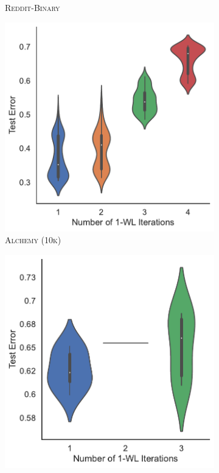 \begin{figure}[!htb]
\begin{subfigure}[b]{0.19\textwidth}
        \caption{\scriptsize \textsc{Reddit-Binary}}
	\end{subfigure}
	\hfill
	\begin{subfigure}[b]{0.19\textwidth}
		\centering
		\includegraphics[width=\textwidth]{Figures/k_wl_violin_Alchemy10K.pdf}
        \caption{\scriptsize\textsc{Alchemy (10k)}}
	\end{subfigure}
	\hfill
	\begin{subfigure}[b]{0.19\textwidth}
		\centering
		\includegraphics[width=\textwidth]{Figures/k_wl_violin_Alchemy.pdf}

\end{subfigure}
\end{figure}
